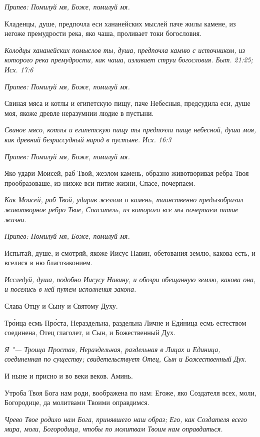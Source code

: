 \itshape Припев:\normalfont{} Помилуй мя, Боже, помилуй мя.


Кладенцы, душе, предпочла еси хананейских мыслей паче жилы камене, из негоже премудрости река, яко чаша, проливает токи богословия.


\itshape Колодцы хананейских помыслов ты, душа, предпочла камню с источником, из которого река премудрости, как чаша, изливает струи богословия. Быт. 21:25; Исх. 17:6\normalfont{}


\itshape Припев:\normalfont{} Помилуй мя, Боже, помилуй мя.


Свиная мяса и котлы и египетскую пищу, паче Небесныя, предсудила еси, душе моя, якоже древле неразумнии людие в пустыни.


\itshape Свиное мясо, котлы и египетскую пищу ты предпочла пище небесной, душа моя, как древний безрассудный народ в пустыне. Исх. 16:3\normalfont{}


\itshape Припев:\normalfont{} Помилуй мя, Боже, помилуй мя.


Яко удари Моисей, раб Твой, жезлом камень, образно животворивая ребра Твоя прообразоваше, из нихже вси питие жизни, Спасе, почерпаем.


\itshape Как Моисей, раб Твой, ударив жезлом о камень, таинственно предызобразил животворное ребро Твое, Спаситель, из которого все мы почерпаем питие жизни.\normalfont{}


\itshape Припев:\normalfont{} Помилуй мя, Боже, помилуй мя.


Испытай, душе, и смотряй, якоже Иисус Навин, обетования землю, какова есть, и вселися в ню благозаконием.


\itshape Исследуй, душа, подобно Иисусу Навину, и обозри обещанную землю, какова она, и поселись в ней путем исполнения закона.\normalfont{}


Слава Отцу и Сыну и Святому Духу.


Тро́ица есмь Про́ста, Нераздельна, раздельна Личне и Еди́ница есмь естеством соединена, Отец глаголет, и Сын, и Божественный Дух.


\itshape Я "--- Троица Простая, Нераздельная, раздельная в Лицах и Единица, соединенная по существу; свидетельствует Отец, Сын и Божественный Дух.\normalfont{}


И ныне и присно и во веки веков. Аминь.


Утроба Твоя Бога нам роди, воображена по нам: Егоже, яко Создателя всех, моли, Богородице, да молитвами Твоими оправдимся.


\itshape Чрево Твое родило нам Бога, принявшего наш образ; Его, как Создателя всего мира, моли, Богородица, чтобы по молитвам Твоим нам оправдаться.\normalfont{}


